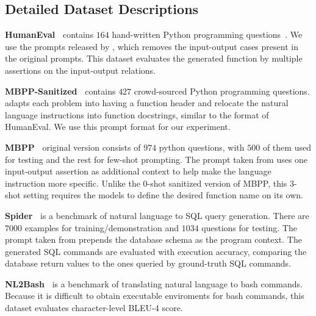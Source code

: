 \documentclass[nohyperref]{article}
\theoremstyle{plain}
\theoremstyle{definition}
\theoremstyle{remark}
\renewcommand{\paragraph}[1]{
     \textbf{#1} 
 }
\begin{document}
\subsection{Detailed Dataset Descriptions}
\label{sec:app-dataset-details}
\paragraph{HumanEval~\citep{codex}} contains $164$ hand-written Python programming questions~\citet{codex}. We use the prompts released by \citet{codet}, which removes the input-output cases present in the original prompts. 
This dataset evaluates the generated function by multiple assertions on the input-output relations.

\paragraph{MBPP-Sanitized~\citep{mbpp}} contains $427$ crowd-sourced Python programming questions. \citet{codet} adapts each problem into having a function header and relocate the natural language instructions into function docstrings, similar to the format of HumanEval. We use this prompt format for our experiment.


\paragraph{MBPP~\citep{mbpp}} original version consists of $974$ python questions, with $500$ of them used for testing and the rest for few-shot prompting.
The prompt taken from \citet{mbr} uses one input-output assertion as additional context to help make the language instruction more specific.
Unlike the 0-shot sanitized version of MBPP, this 3-shot setting requires the models to define the desired function name on its own.

\paragraph{Spider~\citep{spider}} is a benchmark of natural language to SQL query generation.
There are $7000$ examples for training/demonstration and $1034$ questions for testing.
The prompt taken from \citet{mbr} prepends the database schema as the program context.
The generated SQL commands are evaluated with execution accuracy, comparing the database return values to the ones queried by ground-truth SQL commands.

\paragraph{NL2Bash~\citep{nl2bash}} is a benchmark of translating natural language to bash commands.
Because it is difficult to obtain executable enviroments for bash commands, this dataset evaluates character-level BLEU-4 score.
 
\end{document}
